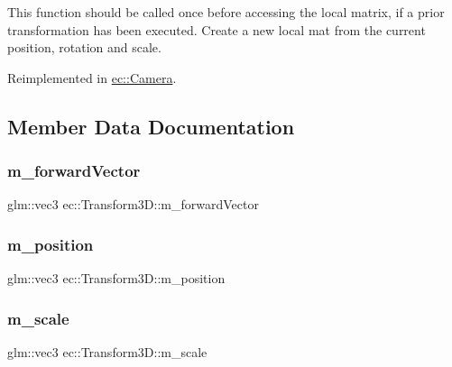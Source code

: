 This function should be called once before accessing the local matrix, if a prior transformation has been executed. Create a new local mat from the current position, rotation and scale. 

Reimplemented in \mbox{\hyperlink{classec_1_1_camera_acff95ac4ca039715d67c83111d03b8c1}{ec\+::\+Camera}}.



\subsection{Member Data Documentation}
\mbox{\label{classec_1_1_transform3_d_a5d7ebb5dc842dc73fe0840f3e3f95ab8}} 
\subsubsection{\texorpdfstring{m\+\_\+forward\+Vector}{m\_forwardVector}}
{\footnotesize\ttfamily glm\+::vec3 ec\+::\+Transform3\+D\+::m\+\_\+forward\+Vector\hspace{0.3cm}{\ttfamily [protected]}}

\mbox{\label{classec_1_1_transform3_d_a5bba8c29bb22d2b122b64b51b52335f7}} 
\subsubsection{\texorpdfstring{m\+\_\+position}{m\_position}}
{\footnotesize\ttfamily glm\+::vec3 ec\+::\+Transform3\+D\+::m\+\_\+position\hspace{0.3cm}{\ttfamily [protected]}}

\mbox{\label{classec_1_1_transform3_d_a8eb8cecaa5ec8273e49c9487e0f6b935}} 
\subsubsection{\texorpdfstring{m\+\_\+scale}{m\_scale}}
{\footnotesize\ttfamily glm\+::vec3 ec\+::\+Transform3\+D\+::m\+\_\+scale\hspace{0.3cm}{\ttfamily [protected]}}

